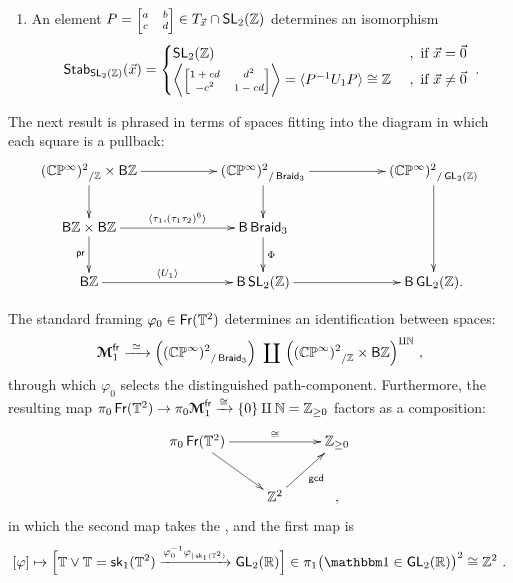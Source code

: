 \begin{observation}
\begin{enumerate}
\item
An element $P=\mbox{\scriptsize$\begin{bmatrix} a & b \\ c & d \end{bmatrix}$} \in T_{\vec{x}} \cap \SL_2(\ZZ)$ determines an isomorphism
\[
{\sf Stab}_{\SL_2(\ZZ)}(\vec{x}) 
=
\begin{cases}
\SL_2(\ZZ)
&
~,
\text{ if } \vec{x} = \vec{0}
\\
\left\lag  
\mbox{\scriptsize$\begin{bmatrix}
1+cd
&
d^2
\\
-c^2
&
1-cd
\end{bmatrix} $}
\right\rag
=
\lag P^{-1} U_1 P \rag
\cong
\ZZ
&
~,
\text{ if } \vec{x} \neq \vec{0}
\end{cases}
~.
\]


\end{enumerate}


\end{observation}










The next result is phrased in terms of spaces fitting into the diagram in which each square is a pullback:
\begin{equation}
\label{q10}
\xymatrix{
{(\CC\PP^\infty)^2}_{/\ZZ
}
\times
\sB\ZZ
\ar[rr]
\ar[d]
&&
{(\CC\PP^\infty)^2}_{/\Braid
}
\ar[rr]
\ar[d]
&&
{(\CC\PP^\infty)^2}_{/\GL_2(\ZZ)}
\ar[dd]
\\
\sB \ZZ
\times
\sB \ZZ
\ar[rr]^-{\lag \tau_1 , (\tau_1\tau_2)^6 \rag}
\ar[d]_-{\pr}
&&
\sB \Braid
\ar[d]^-{\Phi}
&&
\\
\sB \ZZ
\ar[rr]^-{\lag U_1\rag}
&&
\sB \SL_2(\ZZ)
\ar[rr]
&&
\sB \GL_2(\ZZ)
.
}
\end{equation}


\begin{prop}
\label{t26}
The standard framing $\varphi_0 \in \operatorname{\sf Fr}(\mathbb T^2)$ determines an identification between spaces:
\[
\boldsymbol{\mathcal M}_1^{\operatorname{\sf fr}} 
\xrightarrow{~\simeq~}
\Bigl(
{(\mathbb C\mathbb P^\infty)^2}_{/ \operatorname{{\sf Braid}_3}
}
\Bigr)
~\coprod~
\Bigl(
{(\mathbb C\mathbb P^\infty)^2}_{/ \mathbb Z
}
\times 
\mathsf B \mathbb Z
\Bigr)^{ \amalg \mathbb N}
~,
\]
through which $\varphi_0$ selects the distinguished path-component. 
Furthermore, the resulting map $\pi_0 \operatorname{\sf Fr}(\mathbb T^2) \to \pi_0 \boldsymbol{\mathcal M}_1^{\operatorname{\sf fr}} \xrightarrow{\cong} \{0\} \amalg \mathbb N = \mathbb Z_{\geq 0}$ factors as a composition:
\[
\xymatrix{
\pi_0 \Fr(\TT^2) 
\ar[rr]^-{\cong} 
\ar[dr]
&&
\ZZ_{\geq 0}
\\
&
\ZZ^2
\ar[ur]_-{\sf gcd}
&
,
}
\]
in which the second map takes the , and the first map is
\[
[\varphi]
\mapsto
\Bigl[
\TT \vee \TT = \sk_1(\TT^2)
\xra{ \varphi_0^{-1} \varphi _{|\sk_1(\TT^2)} }
\GL_2(\RR) 
\Bigr]
\in \pi_1\bigl(\uno \in \GL_2(\RR)\bigr)^2 \cong \ZZ^2
~.
\]



\end{prop}




